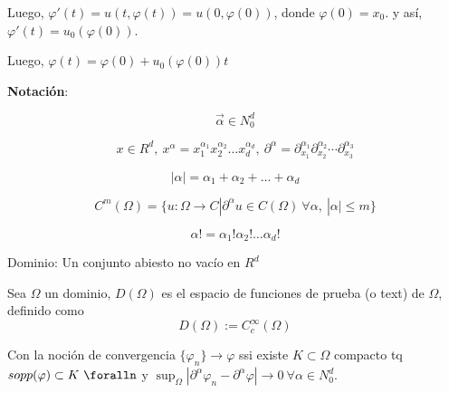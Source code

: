 Luego, $\varphi' (t) = u(t, \varphi(t)) = u(0, \varphi(0))$, donde $\varphi(0)= x_0$. y así, $\varphi' (t) = u_0(\varphi(0))$.


Luego, $\varphi(t) = \varphi(0) + u_0(\varphi(0))t$


\textbf{Notación}:

\begin{equation}
    \vec{\alpha} \in N_0^{d}
\end{equation}

\begin{equation}
    x \in R^d,\ x^{\alpha} = x_1^{\alpha_1} x_2^{\alpha_2} \ldots x_d^{\alpha_d},\ \partial^{\alpha} = \partial_{x_1}^{\alpha_1} \partial_{x_2}^{\alpha_2} \cdots \partial_{x_3}^{\alpha_3}
\end{equation}

\begin{equation}
    |\alpha| = \alpha_1 + \alpha_2 + \ldots + \alpha_d
\end{equation}

\begin{equation}
    C^{m} (\Omega) = \{ u:\Omega \to C | \partial^{\alpha} u \in C(\Omega) \ \forall \alpha, \ |\alpha| \leq m \}
\end{equation}

\begin{equation}
    \alpha! = \alpha_1! \alpha_2! \ldots \alpha_d!
\end{equation}

Dominio: Un conjunto abiesto no vacío en $R^{d}$

\begin{definition}
Sea $\Omega$ un dominio, $D(\Omega)$ es el espacio de funciones de prueba (o text) de $\Omega$, definido como
\begin{equation}
    D(\Omega) := C_c^{\infty}(\Omega)
\end{equation}
\end{definition}

Con la noción de convergencia $\{\varphi_n\} \to \varphi$ ssi existe $K \subset \Omega$ compacto tq $sopp(\varphi)\subset K \ \foralln$ y $\sup_{\Omega} |\partial^{\alpha} \varphi_n - \partial^{\alpha} \varphi| \to 0 \ \forall \alpha \in N_0^{d}$.

